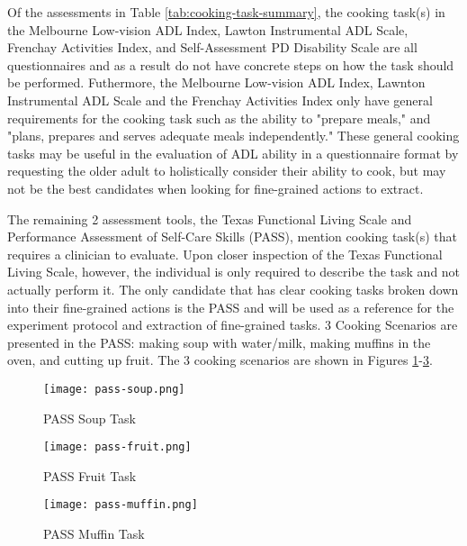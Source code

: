 Of the assessments in Table \ref{tab:cooking-task-summary}, the cooking task(s) in the Melbourne Low-vision ADL Index, Lawton Instrumental ADL Scale, Frenchay Activities Index, and Self-Assessment PD Disability Scale are all questionnaires and as a result do not have concrete steps on how the task should be performed. Futhermore, the Melbourne Low-vision ADL Index, Lawnton Instrumental ADL Scale and the Frenchay Activities Index only have general requirements for the cooking task such as the ability to "prepare meals," and "plans, prepares and serves adequate meals independently." These general cooking tasks may be useful in the evaluation of ADL ability in a questionnaire format by requesting the older adult to holistically consider their ability to cook, but may not be the best candidates when looking for fine-grained actions to extract. 

The remaining 2 assessment tools, the Texas Functional Living Scale and Performance Assessment of Self-Care Skills (PASS), mention cooking task(s) that requires a clinician to evaluate. Upon closer inspection of the Texas Functional Living Scale, however, the individual is only required to describe the task and not actually perform it. The only candidate that has clear cooking tasks broken down into their fine-grained actions is the PASS and will be used as a reference for the experiment protocol and extraction of fine-grained tasks. 3 Cooking Scenarios are presented in the PASS: making soup with water/milk, making muffins in the oven, and cutting up fruit. The 3 cooking scenarios are shown in Figures \ref{fig:PASS-soup}-\ref{fig:PASS-muffin}.


\begin{figure}[ht]
    \centering
    \texttt{[image: pass-soup.png]}
    \caption{PASS Soup Task \cite{rogers_performance_2014}}
    \label{fig:PASS-soup}
\end{figure}

\begin{figure}[ht]
    \centering
    \texttt{[image: pass-fruit.png]}
    \caption{PASS Fruit Task \cite{rogers_performance_2014}}
    \label{fig:PASS-fruit}
\end{figure}

\begin{figure}[ht]
    \centering
    \texttt{[image: pass-muffin.png]}
    \caption{PASS Muffin Task \cite{rogers_performance_2014}}
    \label{fig:PASS-muffin}
\end{figure}

